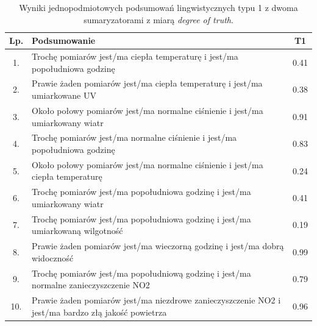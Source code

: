 \documentclass{article}
\begin{document}
\begin{table}[H]
\begin{center}
\normalsize %
\begin{tabular}{|c|p{10cm}|c|} %
\hline
\textbf{Lp.} & \textbf{Podsumowanie} & \textbf{T1} \\ \hline
1. & Trochę pomiarów jest/ma ciepła temperaturę i jest/ma popołudniowa godzinę & 0.41 \\ \hline
2. & Prawie żaden pomiarów jest/ma ciepła temperaturę i jest/ma umiarkowane UV & 0.38 \\ \hline
3. & Około połowy pomiarów jest/ma normalne ciśnienie i jest/ma umiarkowany wiatr & 0.91 \\ \hline
4. & Trochę pomiarów jest/ma normalne ciśnienie i jest/ma popołudniowa godzinę & 0.83 \\ \hline
5. & Około połowy pomiarów jest/ma normalne ciśnienie i jest/ma ciepła temperaturę & 0.24 \\ \hline
6. & Trochę pomiarów jest/ma popołudniowa godzinę i jest/ma umiarkowany wiatr & 0.41 \\ \hline
7. & Trochę pomiarów jest/ma popołudniowa godzinę i jest/ma umiarkowaną wilgotność & 0.19 \\ \hline
8. & Prawie żaden pomiarów jest/ma wieczorną godzinę i jest/ma dobrą widoczność & 0.99 \\ \hline
9. & Trochę pomiarów jest/ma popołudniową godzinę i jest/ma normalne zanieczyszczenie NO2 & 0.79 \\ \hline
10. & Prawie żaden pomiarów jest/ma niezdrowe zanieczyszczenie NO2 i jest/ma bardzo złą jakość powietrza & 0.96 \\ \hline
\end{tabular}
\caption{Wyniki jednopodmiotowych podsumowań lingwistycznych typu 1 z dwoma sumaryzatorami z miarą \textit{degree of truth}.}
\end{center}
\end{table}
\end{document}
